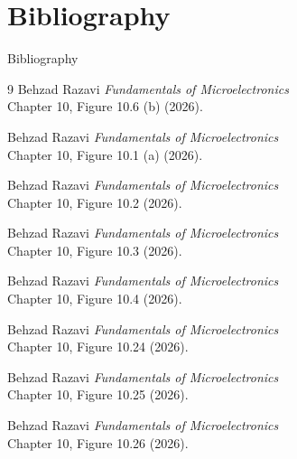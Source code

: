 \documentclass[10pt]{beamer}
\begin{document}
\section{Bibliography}
\begin{frame}[allowframebreaks]{Bibliography}
    \begin{thebibliography}{9}
         Behzad Razavi \textit{Fundamentals of Microelectronics}
        \\ {\scriptsize Chapter 10, Figure 10.6 (b) (2026).}

        \vspace{0.1 cm}

         Behzad Razavi \textit{Fundamentals of Microelectronics}
        \\ {\scriptsize Chapter 10, Figure 10.1 (a) (2026).}

        \vspace{0.1 cm}

         Behzad Razavi \textit{Fundamentals of Microelectronics}
        \\ {\scriptsize Chapter 10, Figure 10.2 (2026).}

        \vspace{0.1 cm}

         Behzad Razavi \textit{Fundamentals of Microelectronics}
        \\ {\scriptsize Chapter 10, Figure 10.3 (2026).}

        \vspace{0.1 cm}

         Behzad Razavi \textit{Fundamentals of Microelectronics}
        \\ {\scriptsize Chapter 10, Figure 10.4 (2026).}

        \vspace{0.1 cm}

         Behzad Razavi \textit{Fundamentals of Microelectronics}
        \\ {\scriptsize Chapter 10, Figure 10.24 (2026).}

        \vspace{0.1 cm}

         Behzad Razavi \textit{Fundamentals of Microelectronics}
        \\ {\scriptsize Chapter 10, Figure 10.25 (2026).}

        \vspace{0.1 cm}

         Behzad Razavi \textit{Fundamentals of Microelectronics}
        \\ {\scriptsize Chapter 10, Figure 10.26 (2026).}


\end{thebibliography}
\end{frame}
\end{document}
